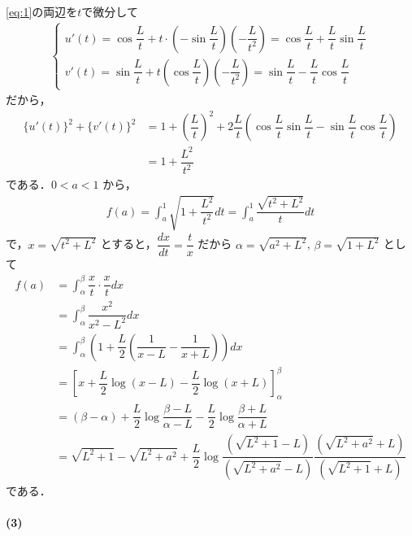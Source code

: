 \documentclass[../../main.tex]{subfiles}
\begin{document}
\cref{eq:1}の両辺を$t$で微分して
\begin{align}
  \begin{cases}
    u'(t) = \cos \dfrac{L}{t} + t \cdot \left( -\sin \dfrac{L}{t} \right) \left( -\dfrac{L}{t^2} \right) = \cos \dfrac{L}{t} + \dfrac{L}{t} \sin \dfrac{L}{t} \\
    v'(t) = \sin \dfrac{L}{t} + t \left( \cos \dfrac{L}{t} \right) \left( -\dfrac{L}{t^2} \right) = \sin \dfrac{L}{t} - \dfrac{L}{t} \cos \dfrac{L}{t}
  \end{cases}
\end{align}
だから，
\begin{align}
  \{u'(t)\}^2 + \{v'(t)\}^2
  &= 1 + \left( \dfrac{L}{t} \right)^2 + 2 \dfrac{L}{t} \left( \cos \dfrac{L}{t} \sin \dfrac{L}{t} - \sin \dfrac{L}{t} \cos \dfrac{L}{t} \right) \\
  &= 1 + \dfrac{L^2}{t^2}
\end{align}
である．$0 < a < 1$ から，
\begin{align}
  f(a) = \int_a^1 \sqrt{1 + \dfrac{L^2}{t^2}} dt = \int_a^1 \dfrac{\sqrt{t^2+L^2}}{t} dt
\end{align}
で，$x = \sqrt{t^2+L^2}$ とすると，$\dfrac{dx}{dt} = \dfrac{t}{x}$ だから $\alpha = \sqrt{a^2+L^2}$, $\beta = \sqrt{1+L^2}$ として
\begin{align}
  f(a)
  &= \int_\alpha^\beta \dfrac{x}{t} \cdot \dfrac{x}{t} dx \\
  &= \int_\alpha^\beta \dfrac{x^2}{x^2-L^2} dx \\
  &= \int_\alpha^\beta \left( 1 + \dfrac{L}{2} \left( \dfrac{1}{x-L} - \dfrac{1}{x+L} \right) \right) dx \\
  &= \left[ x + \dfrac{L}{2} \log (x-L) - \dfrac{L}{2} \log (x+L) \right]_\alpha^\beta \\
  &= (\beta - \alpha) + \dfrac{L}{2} \log \dfrac{\beta-L}{\alpha-L} - \dfrac{L}{2} \log \dfrac{\beta+L}{\alpha+L} \\
  &= \sqrt{L^2+1} - \sqrt{L^2+a^2} + \dfrac{L}{2} \log \dfrac{(\sqrt{L^2+1}-L)}{(\sqrt{L^2+a^2}-L)} \dfrac{(\sqrt{L^2+a^2}+L)}{(\sqrt{L^2+1}+L)} \label{eq:2}
\end{align}
である．

\paragraph{(3)}
\end{document}
